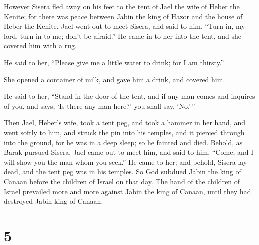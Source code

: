  However Sisera fled away on his feet to the tent of Jael
the wife of Heber the Kenite; for there was peace between Jabin the king
of Hazor and the house of Heber the Kenite.  Jael went out
to meet Sisera, and said to him, ``Turn in, my lord, turn in to me;
don't be afraid.'' He came in to her into the tent, and she covered him
with a rug.

 He said to her, ``Please give me a little water to drink;
for I am thirsty.''

She opened a container of milk, and gave him a drink, and covered him.

 He said to her, ``Stand in the door of the tent, and if
any man comes and inquires of you, and says, `Is there any man here?'
you shall say, `No.'\,''

 Then Jael, Heber's wife, took a tent peg, and took a
hammer in her hand, and went softly to him, and struck the pin into his
temples, and it pierced through into the ground, for he was in a deep
sleep; so he fainted and died.  Behold, as Barak pursued
Sisera, Jael came out to meet him, and said to him, ``Come, and I will
show you the man whom you seek.'' He came to her; and behold, Sisera lay
dead, and the tent peg was in his temples.  So God subdued
Jabin the king of Canaan before the children of Israel on that day.
 The hand of the children of Israel prevailed more and more
against Jabin the king of Canaan, until they had destroyed Jabin king of
Canaan.

\hypertarget{section-4}{%
\section{5}\label{section-4}}

